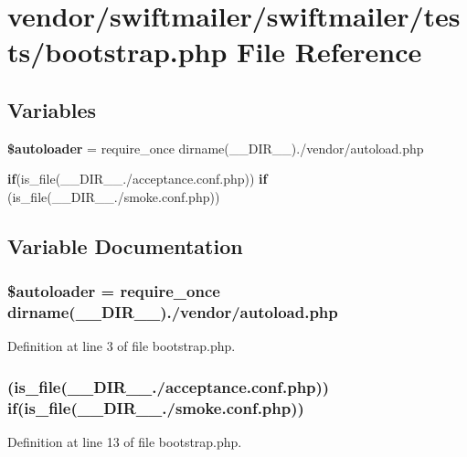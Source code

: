 \section{vendor/swiftmailer/swiftmailer/tests/bootstrap.php File Reference}
\label{swiftmailer_2swiftmailer_2tests_2bootstrap_8php}
\subsection*{Variables}
\begin{DoxyCompactItemize}
\item 
{\bf \$autoloader} = require\+\_\+once dirname(\+\_\+\+\_\+\+D\+I\+R\+\_\+\+\_\+).\textquotesingle{}/vendor/autoload.\+php\textquotesingle{}
\item 
{\bf if}(is\+\_\+file(\+\_\+\+\_\+\+D\+I\+R\+\_\+\+\_\+.\textquotesingle{}/acceptance.\+conf.\+php\textquotesingle{})) {\bf if} (is\+\_\+file(\+\_\+\+\_\+\+D\+I\+R\+\_\+\+\_\+.\textquotesingle{}/smoke.\+conf.\+php\textquotesingle{}))
\end{DoxyCompactItemize}


\subsection{Variable Documentation}
\subsubsection[{\$autoloader}]{\setlength{\rightskip}{0pt plus 5cm}\$autoloader = require\+\_\+once dirname(\+\_\+\+\_\+\+D\+I\+R\+\_\+\+\_\+).\textquotesingle{}/vendor/autoload.\+php\textquotesingle{}}\label{swiftmailer_2swiftmailer_2tests_2bootstrap_8php_a10137df287727ac9084e9687ab25755c}


Definition at line 3 of file bootstrap.\+php.

\subsubsection[{if}]{ (is\+\_\+file(\+\_\+\+\_\+\+D\+I\+R\+\_\+\+\_\+.\textquotesingle{}/acceptance.\+conf.\+php\textquotesingle{})) {\bf if}(is\+\_\+file(\+\_\+\+\_\+\+D\+I\+R\+\_\+\+\_\+.\textquotesingle{}/smoke.\+conf.\+php\textquotesingle{}))}\label{swiftmailer_2swiftmailer_2tests_2bootstrap_8php_a4709a2327aca97e0fce0c5fb77a773a8}


Definition at line 13 of file bootstrap.\+php.

